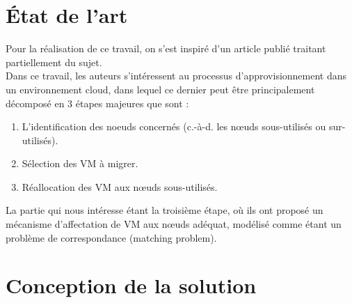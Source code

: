 \section{État de l’art}
Pour la réalisation de ce travail\cite{jing2016}, on s’est inspiré d’un article publié  traitant partiellement du sujet. \\
Dans ce travail, les auteurs s’intéressent au processus d'approvisionnement dans un environnement cloud, dans lequel ce dernier peut être principalement décomposé en 3 étapes majeures que sont : 
\begin{enumerate}
    \item L’identification des noeuds concernés (c.-à-d. les nœuds sous-utilisés ou sur-utilisés). 
    \item Sélection des VM à migrer.
    \item Réallocation des VM aux nœuds sous-utilisés.
\end{enumerate}
La partie qui nous intéresse étant la troisième étape,  où ils ont proposé un mécanisme d’affectation de VM aux nœuds adéquat, modélisé comme étant un problème de correspondance (matching problem).
\section{Conception de la solution}
